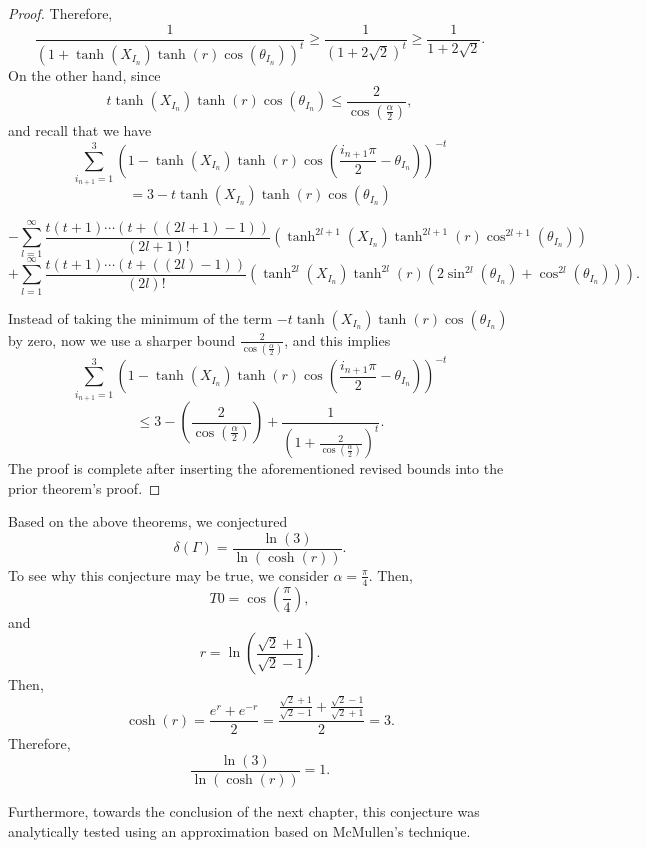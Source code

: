 \documentclass[12pt,oneside]{sfsuthesis}
\theoremstyle{plain} %
\theoremstyle{definition}  %
\theoremstyle{remark}  %
\theoremstyle{plain}
\begin{document}
{\begin{proof}
Therefore,
$$
\frac{1}{\left(1+\tanh\left(X_{I_n}\right)\tanh\left(r\right)\cos\left(\theta_{I_n}\right)\right)^t}\geq \frac{1}{\left(1+2\sqrt{2}\right)^t}\geq \frac{1}{1+2\sqrt{2}}.
$$
On the other hand, since 
$$
t\tanh\left(X_{I_n} \right)\tanh\left(r\right)\cos\left(\theta_{I_n}\right)\leq \frac{2}{\cos\left(\frac{\alpha}{2}\right)},
$$
and recall that we have
$$
\sum_{i_{n+1}=1}^{3}\left(1-\tanh\left(X_{I_n}\right)\tanh\left(r\right)\cos\left(\frac{i_{n+1}\pi}{2}-\theta_{I_{n}}\right)\right)^{-t}
$$
$$
=3-t\tanh\left(X_{I_n} \right)\tanh\left(r\right)\cos\left(\theta_{I_n}\right)
$$
\begin{small}
$$
-\sum_{l=1}^{\infty}\frac{t\left(t+1\right)\cdots\left(t+\left((2l+1)-1\right)\right)}{\left(2l+1\right)!}
\left( 
\tanh^{2l+1}\left(X_{I_n}\right)\tanh^{2l+1}\left(r\right)\cos^{2l+1}\left(\theta_{I_n}\right)
\right)
$$
$$
+\sum_{l=1}^{\infty}\frac{t\left(t+1\right)\cdots\left(t+\left((2l)-1\right)\right)}{\left(2l\right)!}
\left( 
\tanh^{2l}\left(X_{I_n}\right)\tanh^{2l}\left(r\right)\left(2\sin^{2l}\left(\theta_{I_n}\right)+\cos^{2l}\left(\theta_{I_n}\right)\right)
\right).
$$
\end{small}
Instead of taking the minimum of the term $-t\tanh\left(X_{I_n} \right)\tanh\left(r\right)\cos\left(\theta_{I_n}\right)$ by zero, now we use a sharper bound $\frac{2}{\cos\left(\frac{\alpha}{2}\right)}$, and this implies 
$$
\sum_{i_{n+1}=1}^{3}\left(1-\tanh\left(X_{I_n}\right)\tanh\left(r\right)\cos\left(\frac{i_{n+1}\pi}{2}-\theta_{I_{n}}\right)\right)^{-t}
$$
$$
\leq 3-\left(\frac{2}{\cos\left(\frac{\alpha}{2}\right)}\right)+\frac{1}{\left(
1+\frac{2}{\cos\left(\frac{\alpha}{2}\right)}
\right)^t}.
$$
The proof is complete after inserting the aforementioned revised bounds into the prior theorem's proof.
\end{proof}



Based on the above theorems, we conjectured
$$
\delta\left(\Gamma\right)=\frac{\ln\left(3\right)}{\ln\left(\cosh\left(r\right)\right)}.
$$
To see why this conjecture may be true, we consider $\alpha=\frac{\pi}{4}$. Then, 
$$
T0=\cos\left(\frac{\pi}{4}\right),
$$
and 
$$
r=\ln\left(\frac{\sqrt{2}+1}{\sqrt{2}-1}\right).
$$
Then, 
$$
\cosh\left(r\right)=\frac{e^r+e^{-r}}{2}=\frac{\frac{\sqrt{2}+1}{\sqrt{2}-1}+\frac{\sqrt{2}-1}{\sqrt{2}+1}}{2}=3.
$$
Therefore,
$$
\frac{\ln\left(3\right)}{\ln\left(\cosh\left(r\right)\right)}=1.
$$

Furthermore, towards the conclusion of the next chapter, this conjecture was analytically tested using an approximation based on McMullen's technique.


}
\end{document}
